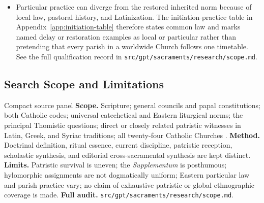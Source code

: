 {\begin{itemize}[itemsep=0.18em,topsep=0.25em]
\item Particular practice can diverge from the restored inherited norm because of local law, pastoral history, and Latinization. The initiation-practice table in Appendix~\ref{app:initiation-table} therefore states common law and marks named delay or restoration examples as local or particular rather than pretending that every parish in a worldwide Church follows one timetable. See the full qualification record in \nolinkurl{src/gpt/sacraments/research/scope.md}.
\end{itemize}
}

\subsection*{Search Scope and Limitations}

\begin{studybox}{Compact source panel}
\textbf{Scope.} Scripture; general councils and papal constitutions; both Catholic codes; universal catechetical and Eastern liturgical norms; the principal Thomistic questions; direct or closely related patristic witnesses in Latin, Greek, and Syriac traditions; all twenty-four Catholic Churches . \textbf{Method.} Doctrinal definition, ritual essence, current discipline, patristic reception, scholastic synthesis, and editorial cross-sacramental synthesis are kept distinct. \textbf{Limits.} Patristic survival is uneven; the \emph{Supplementum} is posthumous; hylomorphic assignments are not dogmatically uniform; Eastern particular law and parish practice vary; no claim of exhaustive patristic or global ethnographic coverage is made. \textbf{Full audit.} \nolinkurl{src/gpt/sacraments/research/scope.md}.
\end{studybox}
